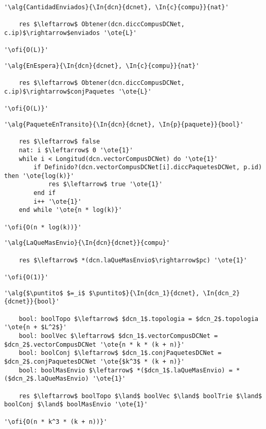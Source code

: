 \begin{lstlisting}[mathescape]
'\alg{CantidadEnviados}{\In{dcn}{dcnet}, \In{c}{compu}}{nat}'

	res $\leftarrow$ Obtener(dcn.diccCompusDCNet, c.ip)$\rightarrow$enviados '\ote{L}'

'\ofi{O(L)}'
\end{lstlisting}

\begin{lstlisting}[mathescape]
'\alg{EnEspera}{\In{dcn}{dcnet}, \In{c}{compu}}{nat}'

	res $\leftarrow$ Obtener(dcn.diccCompusDCNet, c.ip)$\rightarrow$conjPaquetes '\ote{L}'

'\ofi{O(L)}'
\end{lstlisting}

\begin{lstlisting}[mathescape]
'\alg{PaqueteEnTransito}{\In{dcn}{dcnet}, \In{p}{paquete}}{bool}'

	res $\leftarrow$ false
	nat: i $\leftarrow$ 0 '\ote{1}'
	while i < Longitud(dcn.vectorCompusDCNet) do '\ote{1}'
		if Definido?(dcn.vectorCompusDCNet[i].diccPaquetesDCNet, p.id) then '\ote{log(k)}'
			res $\leftarrow$ true '\ote{1}'
		end if
		i++ '\ote{1}'
	end while '\ote{n * log(k)}'

'\ofi{O(n * log(k))}'
\end{lstlisting}

\begin{lstlisting}[mathescape]
'\alg{LaQueMasEnvio}{\In{dcn}{dcnet}}{compu}'

	res $\leftarrow$ *(dcn.laQueMasEnvio$\rightarrow$pc) '\ote{1}'

'\ofi{O(1)}'
\end{lstlisting}

\begin{lstlisting}[mathescape]
'\alg{$\puntito$ $=_i$ $\puntito$}{\In{dcn_1}{dcnet}, \In{dcn_2}{dcnet}}{bool}'

	bool: boolTopo $\leftarrow$ $dcn_1$.topologia = $dcn_2$.topologia '\ote{n + $L^2$}'
	bool: boolVec $\leftarrow$ $dcn_1$.vectorCompusDCNet = $dcn_2$.vectorCompusDCNet '\ote{n * k * (k + n)}'
	bool: boolConj $\leftarrow$ $dcn_1$.conjPaquetesDCNet = $dcn_2$.conjPaquetesDCNet '\ote{$k^3$ * (k + n)}'
	bool: boolMasEnvio $\leftarrow$ *($dcn_1$.laQueMasEnvio) = *($dcn_2$.laQueMasEnvio) '\ote{1}'

	res $\leftarrow$ boolTopo $\land$ boolVec $\land$ boolTrie $\land$ boolConj $\land$ boolMasEnvio '\ote{1}'

'\ofi{O(n * k^3 * (k + n))}'
\end{lstlisting}

